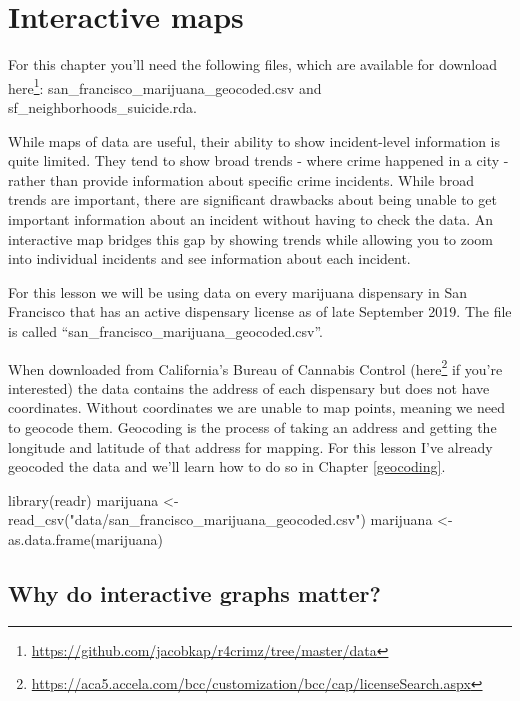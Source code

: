 \documentclass[
]{krantz}
\makeatletter
\newenvironment{Shaded}{\begin{snugshade}}{\end{snugshade}}
\newcommand{\FunctionTok}[1]{\textcolor[rgb]{0,0,0}{#1}}
\newcommand{\NormalTok}[1]{#1}
\newcommand{\OtherTok}[1]{\textcolor[rgb]{0.37,0.37,0.37}{#1}}
\newcommand{\StringTok}[1]{\textcolor[rgb]{0.5,0.5,0.5}{#1}}
\renewcommand{\href}[2]{#2\footnote{\url{#1}}}
\newenvironment{kframe}{%
\medskip{}
\setlength{\fboxsep}{.8em}
 \def\at@end@of@kframe{}%
 \ifinner\ifhmode%
  \def\at@end@of@kframe{\end{minipage}}%
  \begin{minipage}{\columnwidth}%
 \fi\fi%
 \def\FrameCommand##1{\hskip\@totalleftmargin \hskip-\fboxsep
 \colorbox{shadecolor}{##1}\hskip-\fboxsep
     \hskip-\linewidth \hskip-\@totalleftmargin \hskip\columnwidth}%
 \MakeFramed {\advance\hsize-\width
   \@totalleftmargin\z@ \linewidth\hsize
   \@setminipage}}%
 {\par\unskip\endMakeFramed%
 \at@end@of@kframe}
\renewenvironment{Shaded}{\begin{kframe}}{\end{kframe}}
\makeatother
\begin{document}
\hypertarget{interactive-maps}{%
\chapter{Interactive maps}\label{interactive-maps}}

For this chapter you'll need the following files, which are
available for download
\href{https://github.com/jacobkap/r4crimz/tree/master/data}{here}:
san\_francisco\_marijuana\_geocoded.csv and
sf\_neighborhoods\_suicide.rda.

While maps of data are useful, their ability to show
incident-level information is quite limited. They tend to
show broad trends - where crime happened in a city - rather
than provide information about specific crime incidents.
While broad trends are important, there are significant
drawbacks about being unable to get important information
about an incident without having to check the data. An
interactive map bridges this gap by showing trends while
allowing you to zoom into individual incidents and see
information about each incident.

For this lesson we will be using data on every marijuana
dispensary in San Francisco that has an active dispensary
license as of late September 2019. The file is called
``san\_francisco\_marijuana\_geocoded.csv''.

When downloaded from California's Bureau of Cannabis Control
(\href{https://aca5.accela.com/bcc/customization/bcc/cap/licenseSearch.aspx}{here}
if you're interested) the data contains the address of each
dispensary but does not have coordinates. Without
coordinates we are unable to map points, meaning we need to
geocode them. Geocoding is the process of taking an address
and getting the longitude and latitude of that address for
mapping. For this lesson I've already geocoded the data and
we'll learn how to do so in Chapter \ref{geocoding}.

\begin{Shaded}
\begin{Highlighting}[]
\FunctionTok{library}\NormalTok{(readr)}
\NormalTok{marijuana }\OtherTok{\textless{}{-}} \FunctionTok{read\_csv}\NormalTok{(}\StringTok{"data/san\_francisco\_marijuana\_geocoded.csv"}\NormalTok{)}
\NormalTok{marijuana }\OtherTok{\textless{}{-}} \FunctionTok{as.data.frame}\NormalTok{(marijuana)}
\end{Highlighting}
\end{Shaded}

\hypertarget{why-do-interactive-graphs-matter}{%
\section{Why do interactive graphs
matter?}\label{why-do-interactive-graphs-matter}}
\end{document}
